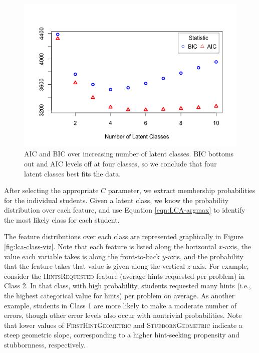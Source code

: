 \documentclass{edm_template}
\newcommand{\ftr}[1]{\textsc{#1}}
\begin{document}
\begin{figure}[htbp]
\includegraphics[scale=0.4]{lca-stats-plot.png}
\caption{AIC and BIC over increasing number of latent classes. BIC bottoms out and AIC levels off at four classes, so we conclude that four latent classes best fits the data.}
\label{fig:lca-test-statistics}
\end{figure}

After selecting the appropriate $C$ parameter, we extract membership probabilities for the individual students. Given a latent class, we know the probability distribution over each feature, and use Equation \ref{eqn:LCA-argmax} to identify the most likely class for each student.

The feature distributions over each class are represented graphically in Figure \ref{fig:lca-class-viz}. Note that each feature is listed along the horizontal $x$-axis, the value each variable takes is along the front-to-back $y$-axis, and the probability that the feature takes that value is given along the vertical $z$-axis. For example, consider the \ftr{HintsRequested} feature (average hints requested per problem) in Class 2. In that class, with high probability, students requested many hints (i.e., the highest categorical value for hints) per problem on average. As another example, students in Class 1 are more likely to make a moderate number of errors, though other error levels also occur with nontrivial probabilities. Note that lower values of \ftr{FirstHintGeometric} and \ftr{StubbornGeometric} indicate a steep geometric slope, corresponding to a higher hint-seeking propensity and stubbornness, respectively.
\end{document}
